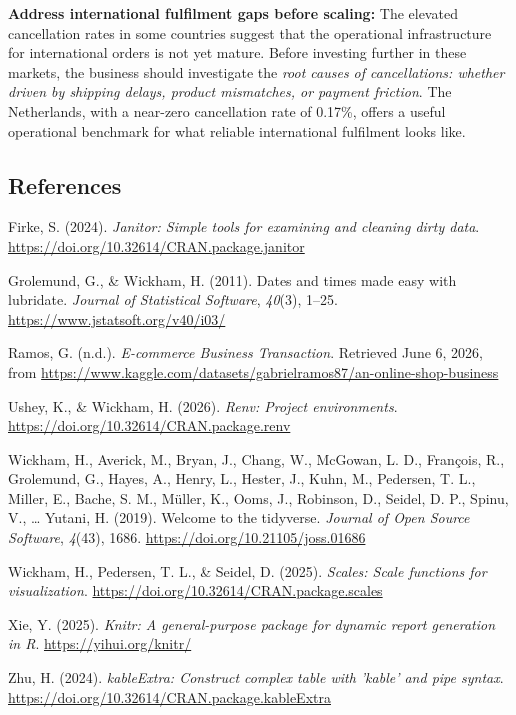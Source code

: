\documentclass[
  letterpaper,
  DIV=11,
  numbers=noendperiod]{scrartcl}
\newlength{\cslhangindent}
\newenvironment{CSLReferences}[2] %
 {\begin{list}{}{%
  \setlength{\itemindent}{0pt}
  \setlength{\leftmargin}{0pt}
  \setlength{\parsep}{0pt}
  \ifodd #1
   \setlength{\leftmargin}{\cslhangindent}
   \setlength{\itemindent}{-1\cslhangindent}
  \fi
  \setlength{\itemsep}{#2\baselineskip}}}
 {\end{list}}
\begin{document}
\textbf{Address international fulfilment gaps before scaling:} The
elevated cancellation rates in some countries suggest that the
operational infrastructure for international orders is not yet mature.
Before investing further in these markets, the business should
investigate the \emph{root causes of cancellations: whether driven by
shipping delays, product mismatches, or payment friction}. The
Netherlands, with a near-zero cancellation rate of 0.17\%, offers a
useful operational benchmark for what reliable international fulfilment
looks like.

\subsection{References}\label{references}

\protect{}\label{refs}
\begin{CSLReferences}{1}{0}
Firke, S. (2024). \emph{Janitor: Simple tools for examining and cleaning
dirty data}. \url{https://doi.org/10.32614/CRAN.package.janitor}

Grolemund, G., \& Wickham, H. (2011). Dates and times made easy with
{lubridate}. \emph{Journal of Statistical Software}, \emph{40}(3),
1--25. \url{https://www.jstatsoft.org/v40/i03/}

Ramos, G. (n.d.). \emph{E-commerce {Business} {Transaction}}. Retrieved
June 6, 2026, from
\url{https://www.kaggle.com/datasets/gabrielramos87/an-online-shop-business}

Ushey, K., \& Wickham, H. (2026). \emph{Renv: Project environments}.
\url{https://doi.org/10.32614/CRAN.package.renv}

Wickham, H., Averick, M., Bryan, J., Chang, W., McGowan, L. D.,
François, R., Grolemund, G., Hayes, A., Henry, L., Hester, J., Kuhn, M.,
Pedersen, T. L., Miller, E., Bache, S. M., Müller, K., Ooms, J.,
Robinson, D., Seidel, D. P., Spinu, V., \ldots{} Yutani, H. (2019).
Welcome to the {tidyverse}. \emph{Journal of Open Source Software},
\emph{4}(43), 1686. \url{https://doi.org/10.21105/joss.01686}

Wickham, H., Pedersen, T. L., \& Seidel, D. (2025). \emph{Scales: Scale
functions for visualization}.
\url{https://doi.org/10.32614/CRAN.package.scales}

Xie, Y. (2025). \emph{Knitr: A general-purpose package for dynamic
report generation in {R}}. \url{https://yihui.org/knitr/}

Zhu, H. (2024). \emph{kableExtra: Construct complex table with 'kable'
and pipe syntax}. \url{https://doi.org/10.32614/CRAN.package.kableExtra}

\end{CSLReferences}
\end{document}
